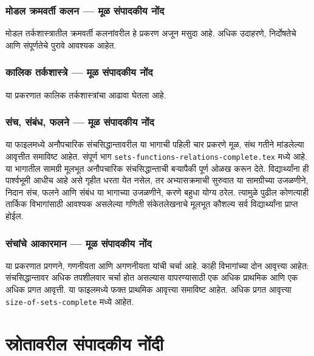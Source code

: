 \subsection{मोडल क्रमवर्ती कलन — मूळ संपादकीय नोंद}\label{source-driver:OLP-0470}
\begin{editorial}
  मोडल तर्कशास्त्रातील क्रमवर्ती कलनांवरील हे प्रकरण
  अजून मसुदा आहे. अधिक उदाहरणे, निर्दोषतेचे आणि
  संपूर्णतेचे पुरावे आवश्यक आहेत.
\end{editorial}
\subsection{कालिक तर्कशास्त्रे — मूळ संपादकीय नोंद}\label{source-driver:OLP-0476}
\begin{editorial}
  या प्रकरणात कालिक तर्कशास्त्रांचा आढावा घेतला आहे.
\end{editorial}
\subsection{संच, संबंध, फलने — मूळ संपादकीय नोंद}\label{source-driver:OLP-0720}
\begin{editorial}
  या फाइलमध्ये अनौपचारिक संचसिद्धान्तावरील या भागाची
  पहिली चार प्रकरणे मूळ, संथ गतीने मांडलेल्या आवृत्तीत
  समाविष्ट आहेत. संपूर्ण भाग
  \verb|sets-functions-relations-complete.tex| मध्ये आहे.
  या भागातील सामग्री मूलभूत अनौपचारिक संचसिद्धान्ताची
  बऱ्यापैकी पूर्ण ओळख करून देते. विद्यार्थ्यांना ही
  पार्श्वभूमी आधीच आहे असे गृहीत धरता येत नसेल, तर
  अभ्यासक्रमाची सुरुवात या सामग्रीच्या उजळणीने,
  निदान संच, फलने आणि संबंध या भागाच्या उजळणीने,
  करणे बहुधा योग्य ठरेल. त्यामुळे पुढील कोणत्याही
  तार्किक विभागांसाठी आवश्यक असलेल्या गणिती
  संकेतलेखनाचे मूलभूत कौशल्य सर्व विद्यार्थ्यांना
  प्राप्त होईल.
\end{editorial}
\subsection{संचांचे आकारमान — मूळ संपादकीय नोंद}\label{source-driver:OLP-0722}
\begin{editorial}
या प्रकरणात प्रगणने, गणनीयता आणि अगणनीयता यांची चर्चा आहे.
काही विभागांच्या दोन आवृत्त्या आहेत: संचसिद्धान्तावर अधिक
तपशीलवार चर्चा होत असल्यास वापरण्यासाठी एक अधिक प्राथमिक
आणि एक अधिक प्रगत आवृत्ती. या फाइलमध्ये फक्त प्राथमिक
आवृत्त्या समाविष्ट आहेत. अधिक प्रगत आवृत्त्या
\verb|size-of-sets-complete| मध्ये आहेत.
\end{editorial}
\chapter*{स्रोतावरील संपादकीय नोंदी}
